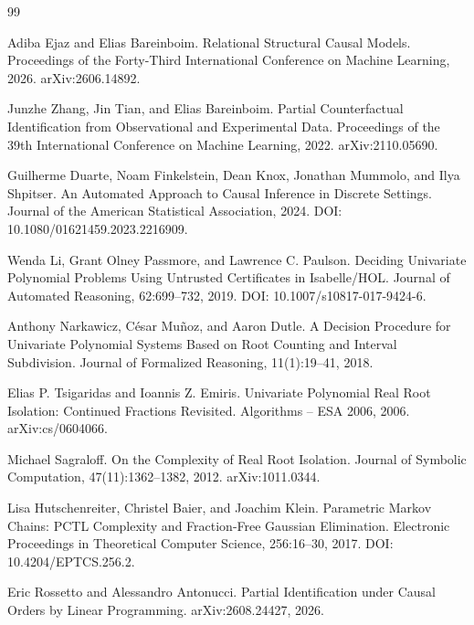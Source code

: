\documentclass{article}
\begin{document}
\begin{thebibliography}{99}

   Adiba Ejaz and Elias Bareinboim. Relational Structural Causal Models. Proceedings of the Forty-Third International Conference on Machine Learning, 2026. arXiv:2606.14892.

   Junzhe Zhang, Jin Tian, and Elias Bareinboim. Partial Counterfactual Identification from Observational and Experimental Data. Proceedings of the 39th International Conference on Machine Learning, 2022. arXiv:2110.05690.

   Guilherme Duarte, Noam Finkelstein, Dean Knox, Jonathan Mummolo, and Ilya Shpitser. An Automated Approach to Causal Inference in Discrete Settings. Journal of the American Statistical Association, 2024. DOI: 10.1080/01621459.2023.2216909.

   Wenda Li, Grant Olney Passmore, and Lawrence C. Paulson. Deciding Univariate Polynomial Problems Using Untrusted Certificates in Isabelle/HOL. Journal of Automated Reasoning, 62:699--732, 2019. DOI: 10.1007/s10817-017-9424-6.

   Anthony Narkawicz, C\'esar Mu\~noz, and Aaron Dutle. A Decision Procedure for Univariate Polynomial Systems Based on Root Counting and Interval Subdivision. Journal of Formalized Reasoning, 11(1):19--41, 2018.

   Elias P. Tsigaridas and Ioannis Z. Emiris. Univariate Polynomial Real Root Isolation: Continued Fractions Revisited. Algorithms -- ESA 2006, 2006. arXiv:cs/0604066.

   Michael Sagraloff. On the Complexity of Real Root Isolation. Journal of Symbolic Computation, 47(11):1362--1382, 2012. arXiv:1011.0344.

   Lisa Hutschenreiter, Christel Baier, and Joachim Klein. Parametric Markov Chains: PCTL Complexity and Fraction-Free Gaussian Elimination. Electronic Proceedings in Theoretical Computer Science, 256:16--30, 2017. DOI: 10.4204/EPTCS.256.2.

   Eric Rossetto and Alessandro Antonucci. Partial Identification under Causal Orders by Linear Programming. arXiv:2608.24427, 2026.


\end{thebibliography}
\end{document}
